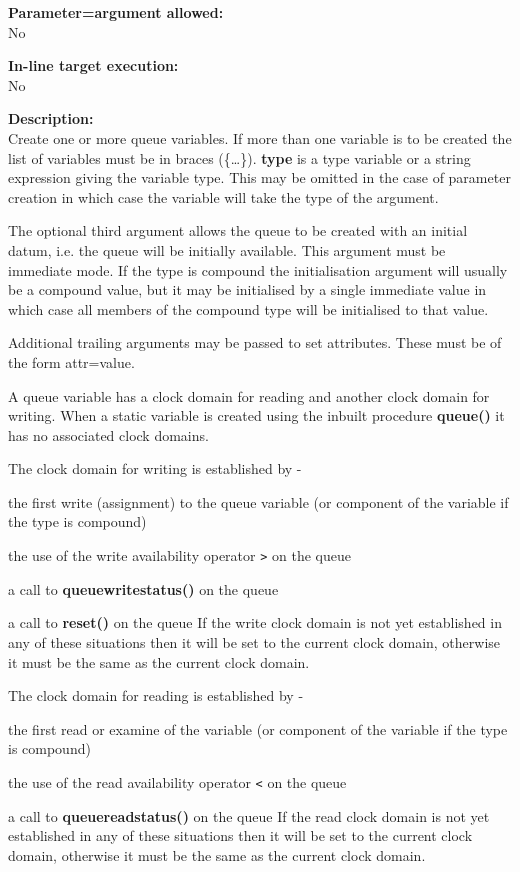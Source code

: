         {\bf Parameter=argument allowed:} \\
        No
        
        {\bf In-line target execution:} \\
        No
        
        {\bf Description:} \\
        Create one or more queue variables. If more than one variable is to be
        created the list of variables must be in braces (\{\dots\}).
        {\bf type} is a type variable or a string expression giving the
        variable type. This may be omitted in the case of parameter
        creation in which case the variable will take the type of the
        argument.
        
        The optional third argument allows the queue to be created with an
        initial datum, i.e. the queue will be initially available. This
        argument must be immediate mode. If the type is compound the
        initialisation argument will usually be a compound value, but it may 
        be initialised by a single immediate value in which case all members of
        the compound type will be initialised to that value.
        
        Additional trailing arguments may be passed to set attributes. These
        must be of the form attr=value.
        
        A queue variable has a clock domain for reading and another clock domain
        for writing. When a static variable is created using the inbuilt
        procedure {\bf queue()} it has no associated clock domains.
        
        The clock domain for writing is established by -
        \blist
        \item   the first write (assignment) to the queue variable (or
                component of the variable if the type is compound)
        \item   the use of the write availability operator \verb'>' on the queue
        \item   a call to {\bf queuewritestatus()} on the queue
        \item   a call to {\bf reset()} on the queue
        \blend
        If the write clock domain is not yet established in any of these
        situations then it will be set to the current clock domain,
        otherwise it must be the same as the current clock domain.

        The clock domain for reading is established by -
        \blist
        \item   the first read or examine of the variable (or component of
                the variable if the type is compound)
        \item   the use of the read availability operator \verb'<' on the queue
        \item   a call to {\bf queuereadstatus()} on the queue
        \blend
        If the read clock domain is not yet established in any of these
        situations then it will be set to the current clock domain,
        otherwise it must be the same as the current clock domain.
        
